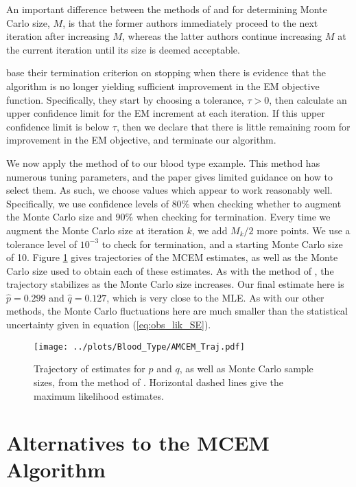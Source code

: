 \documentclass[11pt, oneside]{article}   	%
\begin{document}
An important difference between the methods of \citet{Boo99} and \citeauthor{Caf05} for determining Monte Carlo size, $M$, is that the former authors immediately proceed to the next iteration after increasing $M$, whereas the latter authors continue increasing $M$ at the current iteration until its size is deemed acceptable.

\citeauthor{Caf05} base their termination criterion on stopping when there is evidence that the algorithm is no longer yielding sufficient improvement in the EM objective function. Specifically, they start by choosing a tolerance, $\tau>0$, then calculate an upper confidence limit for the EM increment at each iteration. If this upper confidence limit is below $\tau$, then we declare that there is little remaining room for improvement in the EM objective, and terminate our algorithm.

We now apply the method of \citeauthor{Caf05} to our blood type example. This method has numerous tuning parameters, and the paper gives limited guidance on how to select them. As such, we choose values which appear to work reasonably well. Specifically, we use confidence levels of $80\%$ when checking whether to augment the Monte Carlo size and $90\%$ when checking for termination. Every time we augment the Monte Carlo size at iteration $k$, we add $M_k/2$ more points. We use a tolerance level of $10^{-3}$ to check for termination, and a starting Monte Carlo size of 10. Figure \ref{fig:blood_AMCEM_traj} gives trajectories of the MCEM estimates, as well as the Monte Carlo size used to obtain each of these estimates. As with the method of \citet{Boo99}, the trajectory stabilizes as the Monte Carlo size increases. Our final estimate here is $\hat{p} = 0.299$ and $\hat{q} = 0.127$, which is very close to the MLE. As with our other methods, the Monte Carlo fluctuations here are much smaller than the statistical uncertainty given in equation (\ref{eq:obs_lik_SE}).

\begin{figure}
    \centering
    \caption{Trajectory of estimates for $p$ and $q$, as well as Monte Carlo sample sizes, from the method of \citeauthor{Caf05}. Horizontal dashed lines give the maximum likelihood estimates.}
    \label{fig:blood_AMCEM_traj}
    \texttt{[image: ../plots/Blood\_Type/AMCEM\_Traj.pdf]}   
\end{figure}

\section{Alternatives to the MCEM Algorithm}
\label{sec:alternatives}
\end{document}
